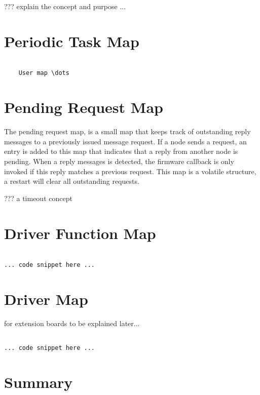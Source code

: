  ??? explain the concept and purpose ...

 \section{Periodic Task Map}

\lstset{language=c++, style=codesnippetstyle}
\begin{lstlisting}

    User map \dots

\end{lstlisting}

 \section{Pending Request Map}

The pending request map, is a small map that keeps track of outstanding reply messages to a previously issued message request. If a node sends a request, an entry is added to this map that indicates that a reply from another node is pending. When a reply messages is detected, the firmware callback is only invoked if this reply matches a previous request. This map is a volatile structure, a restart will clear all outstanding requests.

??? a timeout concept

\section{Driver Function Map}

\lstset{language=c++, style=codesnippetstyle}
\begin{lstlisting}

... code snippet here ...

\end{lstlisting}

\section{Driver Map}

for extension boards to be explained later...

\lstset{language=c++, style=codesnippetstyle}
\begin{lstlisting}

... code snippet here ...

\end{lstlisting}

\section{Summary}

